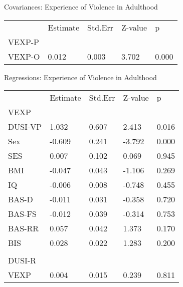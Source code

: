 \documentclass[utf8]{article}
\begin{document}
Covariances: Experience of Violence in Adulthood
\begin{table}[]
\begin{tabular}{lllll}
       & Estimate & Std.Err & Z-value & p     \\
VEXP-P &          &         &         &       \\
VEXP-O & 0.012    & 0.003   & 3.702   & 0.000
\end{tabular}
\end{table}

Regressions: Experience of Violence in Adulthood
\begin{table}[]
\begin{tabular}{lllll}
        & Estimate & Std.Err & Z-value & p     \\
VEXP    &          &         &         &       \\
DUSI-VP & 1.032    & 0.607   & 2.413   & 0.016 \\
Sex     & -0.609   & 0.241   & -3.792  & 0.000 \\
SES     & 0.007    & 0.102   & 0.069   & 0.945 \\
BMI     & -0.047   & 0.043   & -1.106  & 0.269 \\
IQ      & -0.006   & 0.008   & -0.748  & 0.455 \\
BAS-D   & -0.011   & 0.031   & -0.358  & 0.720 \\
BAS-FS  & -0.012   & 0.039   & -0.314  & 0.753 \\
BAS-RR  & 0.057    & 0.042   & 1.373   & 0.170 \\
BIS     & 0.028    & 0.022   & 1.283   & 0.200 \\
        &          &         &         &       \\
DUSI-R  &          &         &         &       \\
VEXP    & 0.004    & 0.015   & 0.239   & 0.811
\end{tabular}
\end{table}
\end{document}
